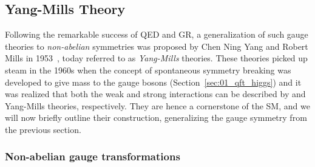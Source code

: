 \subsection{Yang-Mills Theory}
\label{sec:01_qft_gt_yangmills}

Following the remarkable success of QED and GR, a generalization of such gauge theories to \textit{non-abelian} symmetries was proposed by Chen Ning Yang and Robert Mills in 1953~\cite{Yang:1954ek}, today referred to as \textit{Yang-Mills} theories.
These theories picked up steam in the 1960s when the concept of spontaneous symmetry breaking was developed to give mass to the gauge bosons (Section~\ref{sec:01_qft_higgs}) and it was realized that both the weak and strong interactions can be described by \SU[2] and \SU[3] Yang-Mills theories, respectively.
They are hence a cornerstone of the SM, and we will now briefly outline their construction, generalizing the \UU[1] gauge symmetry from the previous section.

\subsubsection{Non-abelian gauge transformations}

